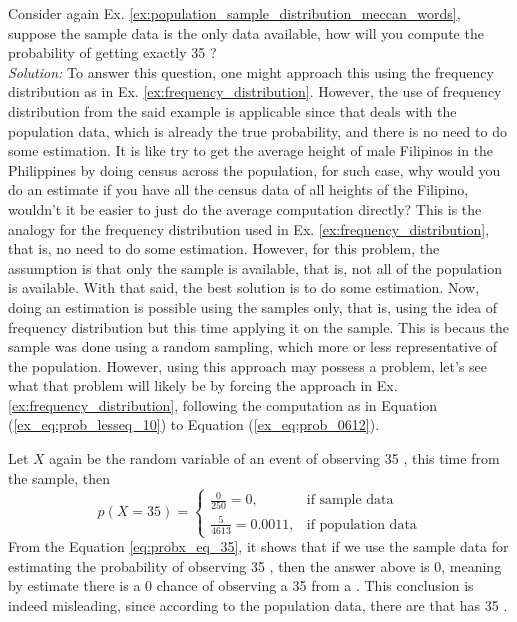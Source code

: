 \begin{exmp}
Consider again Ex. \ref{ex:population_sample_distribution_meccan_words}, suppose the sample data is the only data available, how will you compute the probability of getting exactly 35  ?\\
\textit{Solution:} To answer this question, one might approach this using the frequency distribution as in Ex. \ref{ex:frequency_distribution}. However, the use of frequency distribution from the said example is applicable since that deals with the population data, which is already the true probability, and there is no need to do some estimation. It is like try to get the average height of male Filipinos in the Philippines by doing census across the population, for such case, why would you do an estimate if you have all the census data of all heights of the Filipino, wouldn't it be easier to just do the average computation directly? This is the analogy for the frequency distribution used in Ex. \ref{ex:frequency_distribution}, that is, no need to do some estimation. However, for this problem, the assumption is that only the sample is available, that is, not all of the population is available. With that said, the best solution is to do some estimation. Now, doing an estimation is possible using the samples only, that is, using the idea of frequency distribution but this time applying it on the sample. This is becaus the sample was done using a random sampling, which more or less representative of the population. However, using this approach may possess a problem, let's see what that problem will likely be by forcing the approach in Ex. \ref{ex:frequency_distribution}, following the computation as in Equation (\ref{ex_eq:prob_lesseq_10}) to Equation (\ref{ex_eq:prob_0612}). 

Let $X$ again be the random variable of an event of observing 35  , this time from the sample, then
\begin{equation}\label{eq:probx_eq_35}
     p(X=35)=\begin{cases}
        \displaystyle\frac{0}{250}=0,&\text{if sample data}\\
        \displaystyle\frac{5}{4613}=0.0011,&\text{if population data}
    \end{cases}
\end{equation}
From the Equation \ref{eq:probx_eq_35}, it shows that if we use the sample data for estimating the probability of observing 35 , then the answer above is 0, meaning by estimate there is a 0 chance of observing a 35  from a  . This conclusion is indeed misleading, since according to the population data, there are   that has 35  . 


\end{exmp}
